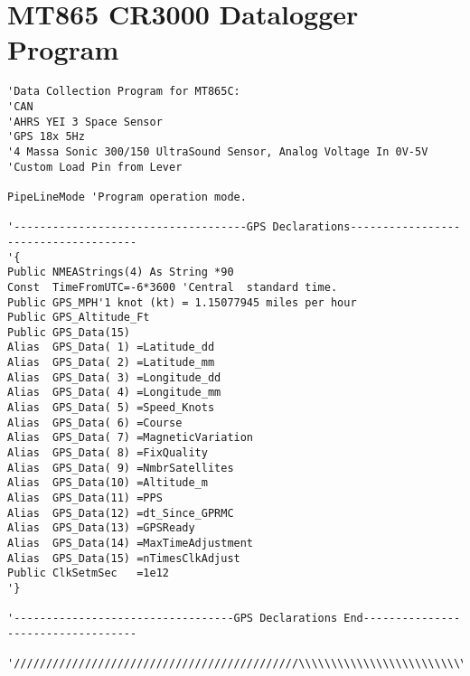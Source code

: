 \chapter{MT865 CR3000 Datalogger Program}
\begin{lstlisting}[basicstyle=\tiny]
'Data Collection Program for MT865C: 
'CAN 
'AHRS YEI 3 Space Sensor
'GPS 18x 5Hz
'4 Massa Sonic 300/150 UltraSound Sensor, Analog Voltage In 0V-5V
'Custom Load Pin from Lever

PipeLineMode 'Program operation mode.

'------------------------------------GPS Declarations-------------------------------------
'{
Public NMEAStrings(4) As String *90
Const  TimeFromUTC=-6*3600 'Central  standard time.
Public GPS_MPH'1 knot (kt) = 1.15077945 miles per hour
Public GPS_Altitude_Ft
Public GPS_Data(15)
Alias  GPS_Data( 1) =Latitude_dd				
Alias  GPS_Data( 2) =Latitude_mm				
Alias  GPS_Data( 3) =Longitude_dd				
Alias  GPS_Data( 4) =Longitude_mm				
Alias  GPS_Data( 5) =Speed_Knots 				
Alias  GPS_Data( 6) =Course							
Alias  GPS_Data( 7) =MagneticVariation	
Alias  GPS_Data( 8) =FixQuality				
Alias  GPS_Data( 9) =NmbrSatellites			
Alias  GPS_Data(10) =Altitude_m					
Alias  GPS_Data(11) =PPS						
Alias  GPS_Data(12) =dt_Since_GPRMC			
Alias  GPS_Data(13) =GPSReady
Alias  GPS_Data(14) =MaxTimeAdjustment
Alias  GPS_Data(15) =nTimesClkAdjust
Public ClkSetmSec   =1e12
'}

'----------------------------------GPS Declarations End-----------------------------------

'////////////////////////////////////////////\\\\\\\\\\\\\\\\\\\\\\\\\\\\\\\\\\\\\\\\\\\\\
  

\end{lstlisting}
